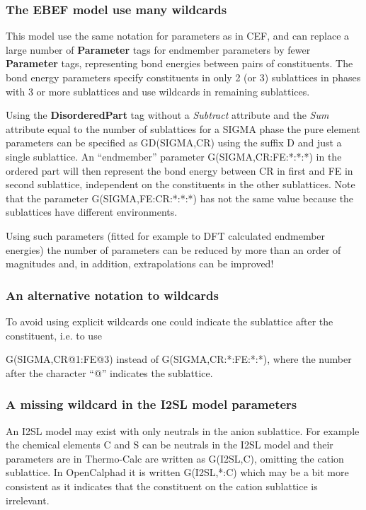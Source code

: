 \documentclass{article}
\begin{document}
\subsubsection{The EBEF model use many wildcards}\label{sec:ebef}

This model use the same notation for parameters as in CEF, and can
replace a large number of {\bf Parameter} tags for endmember
parameters by fewer {\bf Parameter} tags, representing bond energies
between pairs of constituents.  The bond energy parameters specify
constituents in only 2 (or 3) sublattices in phases with 3 or more
sublattices and use wildcards in remaining sublattices.

Using the {\bf DisorderedPart} tag without a {\em Subtract} attribute
and the {\em Sum} attribute equal to the number of sublattices for a
SIGMA phase the pure element parameters can be specified as
GD(SIGMA,CR) using the suffix D and just a single sublattice.  An
``endmember'' parameter G(SIGMA,CR:FE:*:*:*) in the ordered part will
then represent the bond energy between CR in first and FE in second
sublattice, independent on the constituents in the other sublattices.
Note that the parameter G(SIGMA,FE:CR:*:*:*) has not the same value
because the sublattices have different environments.

Using such parameters (fitted for example to DFT calculated endmember
energies) the number of parameters can be reduced by more than an
order of magnitudes and, in addition, extrapolations can be improved!

\subsubsection{An alternative notation to wildcards}

To avoid using explicit wildcards one could indicate the sublattice
after the constituent, i.e. to use

G(SIGMA,CR@1:FE@3) instead of G(SIGMA,CR:*:FE:*:*), where the number
after the character ``@'' indicates the sublattice.

\subsubsection{A missing wildcard in the I2SL model parameters}

An I2SL model may exist with only neutrals in the anion sublattice.
For example the chemical elements C and S can be neutrals in the I2SL
model and their parameters are in Thermo-Calc are written as
G(I2SL,C), omitting the cation sublattice.  In OpenCalphad it is
written G(I2SL,*:C) which may be a bit more consistent as it indicates
that the constituent on the cation sublattice is irrelevant.
\end{document}
